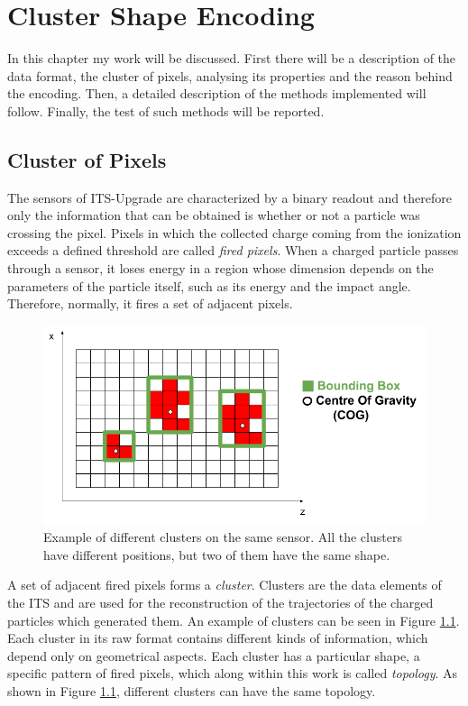 \chapter{Cluster Shape Encoding}
In this chapter my work will be discussed. First there will be a description of the data format, the cluster of pixels, analysing its properties and the reason behind the encoding. Then, a detailed description of the methods implemented will follow. Finally, the test of such methods will be reported.
\section{Cluster of Pixels}
\label{sec:cluster}
The sensors of ITS-Upgrade are characterized by a binary readout and therefore only the information that can be obtained is whether or not a particle was crossing the pixel. Pixels in which the collected charge coming from the ionization exceeds a defined threshold are called \textit{fired pixels}. When a charged particle passes through a sensor, it loses energy in a region whose dimension depends on the parameters of the particle itself, such as its energy and the impact angle. Therefore, normally, it fires a set of adjacent pixels.\\
%
\begin{figure}
  \centering
  \includegraphics[scale=0.55]{figures/cluster.png}
  \caption{Example of different clusters on the same sensor. All the clusters have different positions, but two of them have the same shape.}
  \label{fig:clusters}
\end{figure}
%
A set of adjacent fired pixels forms a \textit{cluster}. Clusters are the data elements of the ITS and are used for the reconstruction of the trajectories of the charged particles which generated them. An example of clusters can be seen in Figure \ref{fig:clusters}. Each cluster in its raw format contains different kinds of information, which depend only on geometrical aspects. Each cluster has a particular shape, a specific pattern of fired pixels, which along within this work is called \textit{topology}. As shown in Figure \ref{fig:clusters}, different clusters can have the same topology.\\
